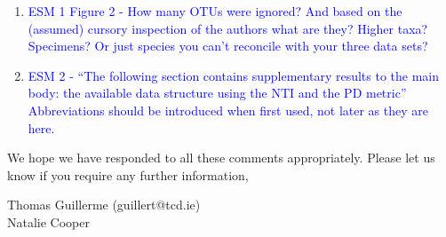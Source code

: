\documentclass[12pt,letterpaper]{article}
\begin{document}
\begin{enumerate}
\item{\textcolor{blue}{ESM 1 Figure 2 - How many OTUs were ignored? And based on the (assumed) cursory inspection of the authors what are they? Higher taxa? Specimens? Or just species you can’t reconcile with your three data sets?}}
\item{\textcolor{blue}{ESM 2 - ``The following section contains supplementary results to the main body: the available data structure using the NTI and the PD metric'' Abbreviations should be introduced when first used, not later as they are here.}}
\end{enumerate}



We hope we have responded to all these comments appropriately. Please let us know if you require any further information,\\
\bigskip



Thomas Guillerme (guillert@tcd.ie)\\ %
Natalie Cooper
\end{document}
